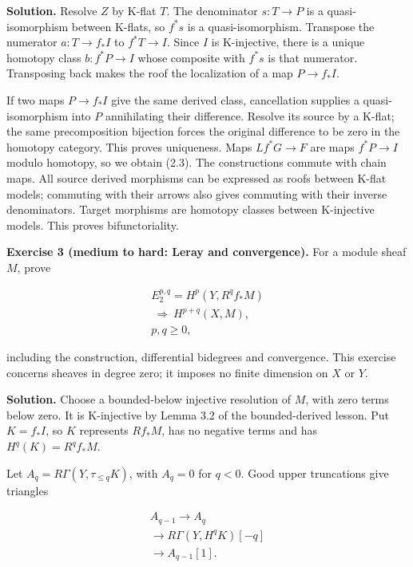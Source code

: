 \documentclass[
  english,
  11pt,
  a4paper,
]{article}
\begin{document}
\textbf{Solution.} Resolve \(Z\) by K-flat \(T\). The denominator
\(s:T\to P\) is a quasi-isomorphism between K-flats, so \(f^*s\) is a
quasi-isomorphism. Transpose the numerator \(a:T\to f_*I\) to
\(f^*T\to I\). Since \(I\) is K-injective, there is a unique homotopy
class \(b:f^*P\to I\) whose composite with \(f^*s\) is that numerator.
Transposing back makes the roof the localization of a map \(P\to f_*I\).

If two maps \(P\to f_*I\) give the same derived class, cancellation
supplies a quasi-isomorphism into \(P\) annihilating their difference.
Resolve its source by a K-flat; the same precomposition bijection forces
the original difference to be zero in the homotopy category. This proves
uniqueness. Maps \(Lf^*G\to F\) are maps \(f^*P\to I\) modulo homotopy,
so we obtain (2.3). The constructions commute with chain maps. All
source derived morphisms can be expressed as roofs between K-flat
models; commuting with their arrows also gives commuting with their
inverse denominators. Target morphisms are homotopy classes between
K-injective models. This proves bifunctoriality.

\textbf{Exercise 3 (medium to hard: Leray and convergence).} For a
module sheaf \(M\), prove

\[\begin{gathered}
E_2^{p,q}=H^p(Y,R^qf_*M)\\
\ \Longrightarrow\ H^{p+q}(X,M),
\\ p,q\ge0,
\end{gathered}
\tag{6.1}\]

including the construction, differential bidegrees and convergence. This
exercise concerns sheaves in degree zero; it imposes no finite dimension
on \(X\) or \(Y\).

\textbf{Solution.} Choose a bounded-below injective resolution of \(M\),
with zero terms below zero. It is K-injective by Lemma 3.2 of the
bounded-derived lesson. Put \(K=f_*I\), so \(K\) represents \(Rf_*M\),
has no negative terms and has \(H^q(K)=R^qf_*M\).

Let \(A_q=R\Gamma(Y,\tau_{\le q}K)\), with \(A_q=0\) for \(q<0\). Good
upper truncations give triangles

\[\begin{gathered}
A_{q-1}\longrightarrow A_q\\
\longrightarrow R\Gamma(Y,H^qK)[-q]
\\ \longrightarrow A_{q-1}[1].
\end{gathered}
\tag{6.2}\]
\end{document}
